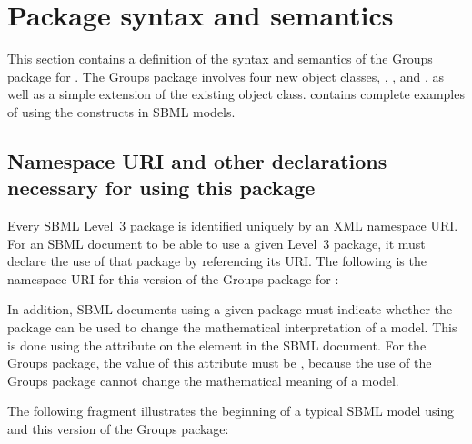 
\section{Package syntax and semantics}
\label{sec:syntax}

This section contains a definition of the syntax and semantics of the Groups package for \sbmlthreecore.  The Groups package involves four new object classes, \Group, \Member, \ListOfMembers and \ListOfGroups, as well as a simple extension of the existing \Model object class.   contains complete examples of using the constructs in SBML models.

\subsection{Namespace URI and other declarations necessary for using this package}
\label{xml-namespace}

Every SBML Level~3 package is identified uniquely by an XML namespace URI.  For an SBML document to be able to use a given Level~3 package, it must declare the use of that package by referencing its URI.  The following is the namespace URI for this version of the Groups package for \sbmlthreecore:
\begin{center}
\end{center}

In addition, SBML documents using a given package must indicate whether the package can be used to change the mathematical interpretation of a model.  This is done using the attribute  on the  element in the SBML document.  For the Groups package, the value of this attribute must be , because the use of the Groups package cannot change the mathematical meaning of a model.

The following fragment illustrates the beginning of a typical SBML model using \sbmlthreecore and this version of the Groups package:

